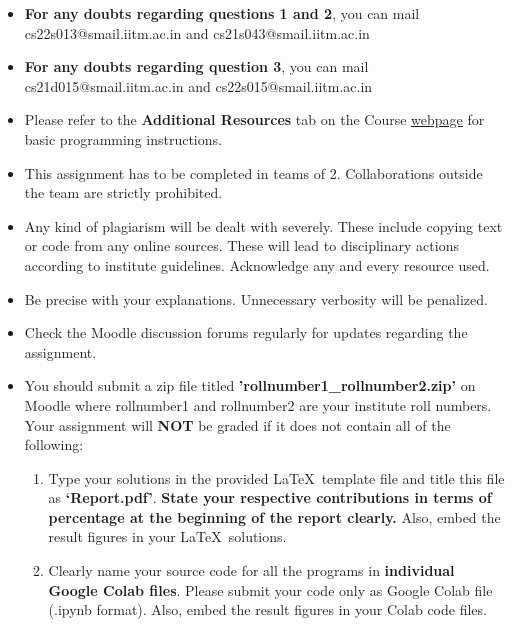 \documentclass[addpoints,12pt,solution]{exam}
\begin{document}
{\small

\begin{itemize}\itemsep0mm
\item \textbf{For any doubts regarding questions 1 and 2}, you can mail cs22s013@smail.iitm.ac.in and cs21s043@smail.iitm.ac.in
\item \textbf{For any doubts regarding question 3}, you can mail cs21d015@smail.iitm.ac.in and cs22s015@smail.iitm.ac.in

\item Please refer to the \textbf{Additional Resources} tab on the Course \href{http://www.cse.iitm.ac.in/~vplab/prml.html}{webpage} for basic programming instructions.

\item This assignment has to be completed in teams of 2. Collaborations outside the team are strictly prohibited.

\item Any kind of plagiarism will be dealt with severely. These include copying text or code from any online sources. These will lead to disciplinary actions according to institute guidelines. Acknowledge any and every resource used.

\item Be precise with your explanations. Unnecessary verbosity will be penalized.

\item Check the Moodle discussion forums regularly for updates regarding the assignment.

\item You should submit a zip file titled \textbf{'rollnumber1\_rollnumber2.zip'} on Moodle where rollnumber1 and rollnumber2 are your institute roll numbers. Your assignment will \textbf{NOT} be graded if it does not contain all of the following:
\begin{enumerate}
    \item Type your solutions in the provided \LaTeX ~template file and title this file as \textbf{‘Report.pdf’}. \textbf{State your respective contributions in terms of percentage at the beginning of the report clearly.} Also, embed the result figures in your \LaTeX ~solutions.
    \item Clearly name your source code for all the programs in \textbf{individual Google Colab files}. Please submit your code only as Google Colab file (.ipynb format). Also, embed the result figures in your Colab code files.
\end{enumerate}


\end{itemize}}
\end{document}
